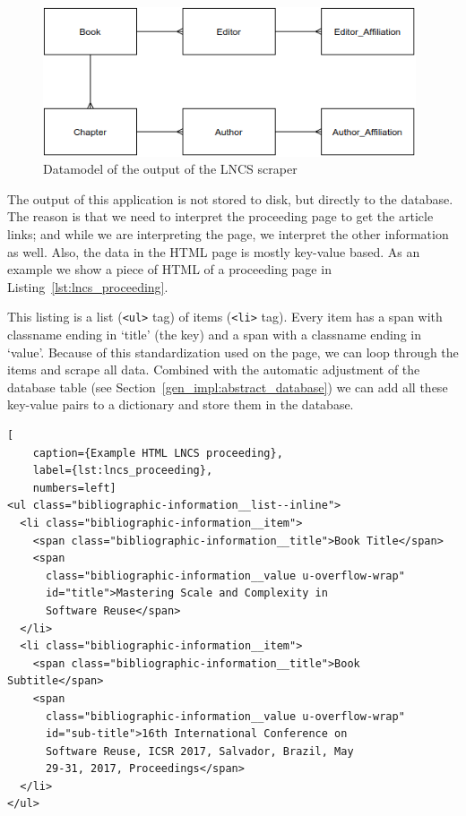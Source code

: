 \documentclass{ou-report}
\newcommand{\lncs}{LNCS}
\begin{document}
\begin{figure}[H]
    \centering
    \includegraphics[width=11cm]{images/lncs_scraper_datamodel.drawio.png}
    \caption{Datamodel of the output of the \lncs{} scraper}
    \label{fig:lncs_scraper_datamodel}
\end{figure}

The output of this application is not stored to disk, but directly to the 
database. The reason is
that we need to interpret the proceeding page to get the article links; and while
we are interpreting the page, we interpret the other information as well. Also,
the data in the HTML page is mostly key-value based. As an example we show a 
piece of HTML of a proceeding page in Listing~\ref{lst:lncs_proceeding}.

This listing is a list (\verb|<ul>| tag) of items (\verb|<li>| tag). Every 
item has a span with classname ending in `title' 
(the key) and a span with a classname ending in `value'. Because of this 
standardization used
on the page, we can loop through the items and scrape all data. 
Combined with the automatic adjustment of the database table (see
Section~\ref{gen_impl:abstract_database}) we can add all these key-value pairs
to a dictionary and store them in the database.

\lstset{language=HTML}
\begin{lstlisting}[
    caption={Example HTML LNCS proceeding},
    label={lst:lncs_proceeding},
    numbers=left]
<ul class="bibliographic-information__list--inline">
  <li class="bibliographic-information__item">
    <span class="bibliographic-information__title">Book Title</span>
    <span
      class="bibliographic-information__value u-overflow-wrap"
      id="title">Mastering Scale and Complexity in
      Software Reuse</span>
  </li>
  <li class="bibliographic-information__item">
    <span class="bibliographic-information__title">Book Subtitle</span>
    <span
      class="bibliographic-information__value u-overflow-wrap"
      id="sub-title">16th International Conference on
      Software Reuse, ICSR 2017, Salvador, Brazil, May
      29-31, 2017, Proceedings</span>
  </li>
</ul>
\end{lstlisting}
\end{document}
